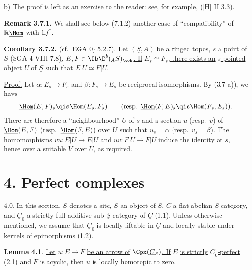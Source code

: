 b) The proof is left as an exercise to the reader: see, for example, ([H] II 3.3).

\textbf{Remark 3.7.1.} We shall see below (7.1.2) another case of ``compatibility'' of \(\mathbb{R}\underline{\Hom}\) with \(\mathbb{L}f^*\).

\textbf{Corollary 3.7.2.} (cf.\ EGA \(0_I\) 5.2.7). \uline{Let} \((\underline{S},A)\) \uline{be a ringed topos,} \(s\) \uline{a point of} \(\underline{S}\) (SGA 4 VIII 7.8)\uline{,} \(E,F\in\Ob\D^b(_A S)_{\coh}\)\uline{. If} \(E_s\simeq F_s\)\uline{, there exists an} \(s\)\uline{-pointed object} \(U\) \uline{of} \(\underline{S}\) \uline{such that} \(E|U\simeq F|U\)\uline{.}

\uline{Proof.} Let \(\alpha:E_s\to F_s\) and \(\beta:F_s\to E_s\) be reciprocal isomorphisms. By (3.7 a)), we have
\[
  \underline{\Hom}(E,F)_s\qis\Hom(E_s,F_s)
  \qquad
  (\text{resp. }\underline{\Hom}(F,E)_s\qis\Hom(F_s,E_s)).
\]
There are therefore a ``neighbourhood'' \(U\) of \(s\) and a section \(u\) (resp.\ \(v\)) of \(\underline{\Hom}(E,F)\) (resp.\ \(\underline{\Hom}(F,E)\)) over \(U\) such that \(u_s=\alpha\) (resp.\ \(v_s=\beta\)). The homomorphisms \(vu:E|U\to E|U\) and \(uv:F|U\to F|U\) induce the identity at \(s\), hence over a suitable \(V\) over \(U\), as required.

%
\section*{4. Perfect complexes}

4.0. In this section, \(\underline{S}\) denotes a site, \(S\) an object of \(\underline{S}\), \(\underline{C}\) a flat abelian \(\underline{S}\)-category, and \(\underline{C}_0\) a strictly full additive sub-\(\underline{S}\)-category of \(\underline{C}\) (1.1). Unless otherwise mentioned, we assume that \(\underline{C}_0\) is locally liftable in \(\underline{C}\) and locally stable under kernels of epimorphisms (1.2).

\textbf{Lemma 4.1}. \uline{Let} \(u:E\to F\) \uline{be an arrow of} \(\Cpx(\underline{C}_S)\)\uline{. If} \(E\) \uline{is strictly} \(\underline{C}_0\)\uline{-perfect} (2.1) \uline{and} \(F\) \uline{is acyclic, then} \(u\) \uline{is locally homotopic to zero.}

